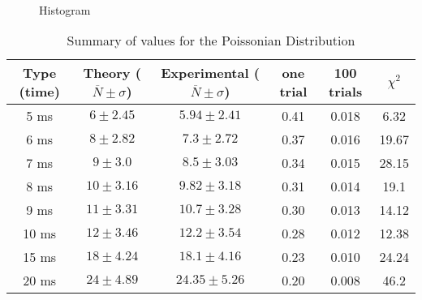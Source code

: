 \documentclass[a4paper,12pt,oneside]{article}
\begin{document}
\begin{figure}[H]
  \centering

  \\
  \\
  \\
  \label{figur}\caption{Histogram}
\end{figure}

\begin{table}[H]
\centering
	\begin{tabular}{|c|c|c|c|c|c|}
	   \hline
	   Type (time) & Theory ($\overline{N}\pm\sigma$)& Experimental ($\overline{N}\pm\sigma$) & one trial & 100 trials & $\chi^2$ \\
		\hline
	   5 ms & $6\pm 2.45$ & $5.94\pm 2.41$ & 0.41 & 0.018 & 6.32\\
	   6 ms & $8\pm 2.82$ & $7.3\pm 2.72$ & 0.37 & 0.016 & 19.67\\
	   7 ms & $9\pm 3.0$ & $8.5\pm 3.03$ & 0.34 & 0.015 & 28.15\\
	   8 ms & $10\pm 3.16$ & $9.82\pm 3.18$ & 0.31 & 0.014 & 19.1\\
	   9 ms & $11\pm 3.31$ & $10.7\pm 3.28$ & 0.30 & 0.013 & 14.12\\
	   10 ms & $12\pm 3.46$ & $12.2\pm 3.54$ & 0.28 & 0.012 & 12.38\\
	   15 ms & $18\pm 4.24$ & $18.1\pm 4.16$ & 0.23 & 0.010 & 24.24\\
	   20 ms & $24\pm 4.89$ & $24.35\pm 5.26$ & 0.20 & 0.008 & 46.2\\
		\hline
	\end{tabular}
	\caption{Summary of values for the Poissonian Distribution}
	\label{tab:poisson}
\end{table}
\end{document}
